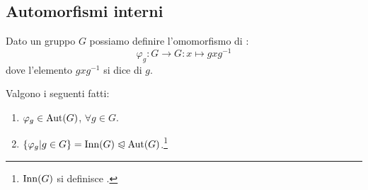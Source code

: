 \documentclass[11pt]{scrartcl}
\begin{document}
\subsection{Automorfismi interni}
\begin{definition}
    Dato un gruppo $G$ possiamo definire l'omomorfismo di :
        \[ \varphi_g : G \longrightarrow G : x \longmapsto gxg^{-1}
            \]
    dove l'elemento $gxg^{-1}$ si dice  di $g$.
\end{definition}

\begin{proposition}
    \label{prop1}
    Valgono i seguenti fatti:
    \begin{enumerate}[(1)]
        \item $\varphi_g \in \operatorname{Aut}(G)$, $\forall g \in G$.
        \item $\{\varphi_g | g \in G\} = \operatorname{Inn}(G) \trianglelefteqslant \operatorname{Aut}(G)$.\footnote{$\operatorname{Inn}(G)$ si definisce .}
    \end{enumerate}
\end{proposition}
\end{document}
